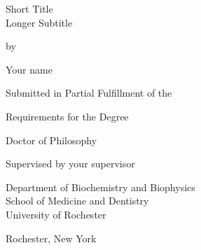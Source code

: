 \begin{titlepage}
  \vspace*{\fill}

  \begin{center}
    {\Huge Short Title \\ Longer Subtitle \par
    }

    \bigskip%
    by

    \bigskip%
    Your name


    \bigskip\bigskip\bigskip\bigskip%
    Submitted in Partial Fulfillment of the

    \bigskip%
    Requirements for the Degree

    \bigskip%
    Doctor of Philosophy


    \bigskip\bigskip\bigskip\bigskip%
    Supervised by your supervisor

    \bigskip\bigskip%
    Department of Biochemistry and Biophysics\\
    School of Medicine and Dentistry\\


    \bigskip\bigskip\bigskip\bigskip%
    University of Rochester

    \bigskip%
    Rochester, New York


    \bigskip\bigskip\bigskip{}
  \end{center}

  \vspace*{\fill}
\end{titlepage}